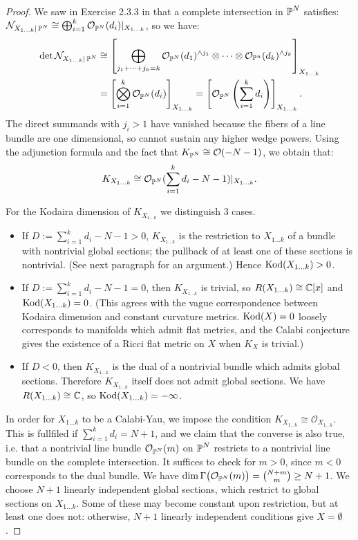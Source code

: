 \documentclass{article}
\begin{document}
\begin{proof}
We saw in Exercise 2.3.3 in \cite{Huy} that a complete intersection in $\operatorname{\mathbb{P}}^N$ satisfies:
$\mathcal{N}_{X_{1\dots k}|\operatorname{\mathbb{P}}^N} \cong \bigoplus_{i=1}^k \mathcal{O}_{\operatorname{\mathbb{P}}^N}(d_i)|_{X_{1\dots k}}$,
so we have:
\begin{align*}
\det \mathcal{N}_{X_{1\dots k}|\operatorname{\mathbb{P}}^N} &\cong \left[ \bigoplus_{j_1 + \dots + j_k = k}
 \mathcal{O}_{\operatorname{\mathbb{P}}^N}(d_1)^{\wedge j_1} \otimes \dots
\otimes \mathcal{O}_{\operatorname{\mathbb{P}}^n}(d_k)^{\wedge j_k} \right]_{X_{1\dots k}} \\
&= \left[ \bigotimes_{i=1}^k \mathcal{O}_{\operatorname{\mathbb{P}}^N}(d_i) \right]_{X_{1\dots k}} 
= \left[ \mathcal{O}_{\operatorname{\mathbb{P}}^N}\left(\sum_{i=1}^k d_i\right) \right]_{X_{1\dots k}}.
\end{align*}
The direct summands with $j_i > 1$ have vanished because the fibers of a line bundle are one dimensional, so cannot
sustain any higher wedge powers. Using the adjunction formula and the fact that $K_{\operatorname{\mathbb{P}}^N} \cong \mathcal{O}(-N-1)$,
we obtain that:
\[	K_{X_{1\dots k}} \cong \mathcal{O}_{\operatorname{\mathbb{P}}^N}(\sum_{i=1}^k d_i - N - 1) |_{X_{1\dots k}}.	\]

For the Kodaira dimension of $K_{X_{1\dots k}}$ we distinguish 3 cases.
\begin{itemize}
\item If $D := \sum_{i=1}^k d_i - N - 1 >0$, $K_{X_{1\dots k}}$ is the restriction to $X_{1\dots k}$ of
a bundle with nontrivial global sections; the pullback of at least one of these sections is nontrivial.
(See next paragraph for an argument.) Hence $\operatorname{Kod}(X_{1\dots k}) > 0$.
\item If $D := \sum_{i=1}^k d_i - N - 1 =0$, then $K_{X_{1\dots k}}$ is trivial, so $R(X_{1\dots k}) \cong
\mathbb{C}[x]$ and $\operatorname{Kod}(X_{1\dots k}) = 0$. (This agrees with the vague correspondence between Kodaira dimension
and constant curvature metrics. $\operatorname{Kod}(X) = 0$ loosely corresponds to manifolds which admit flat metrics,
and the Calabi conjecture gives the existence of a Ricci flat metric on $X$ when $K_X$ is trivial.)
\item If $D  < 0$, then $K_{X_{1\dots k}}$ is the dual of a nontrivial bundle which admits global sections.
Therefore $K_{X_{1\dots k}}$ itself does not admit global sections. We have
$R(X_{1\dots k})\cong \mathbb{C}$, so $\operatorname{Kod}(X_{1\dots k}) = - \infty$.
\end{itemize}

In order for $X_{1\dots k}$ to be a Calabi-Yau, we impose the condition $K_{X_{1\dots k}} \cong \mathcal{O}
_{X_{1\dots k}}$. This is fullfiled if $\sum_{i=1}^k d_i = N+1$, and we claim that the converse is also true, i.e.
that a nontrivial line bundle $\mathcal{O}_{\operatorname{\mathbb{P}}^N}(m)$ on $\operatorname{\mathbb{P}}^N$ restricts to a nontrivial line bundle on the 
complete intersection. It suffices to check for $m>0$, since $m<0$ corresponds to the dual bundle. We have
$\dim \Gamma\big(\mathcal{O}_{\operatorname{\mathbb{P}}^N}(m)\big) = \binom{N+m}{m} \geq N+1$. We choose $N+1$ linearly independent
global sections, which restrict to global sections on $X_{1\dots k}$. Some of these may become constant upon restriction,
but at least one does not: otherwise, $N+1$ linearly independent conditions give $X = \emptyset$.


\end{proof}
\end{document}
